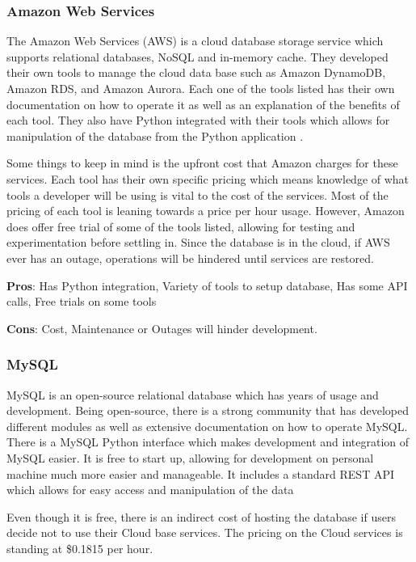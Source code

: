 \documentclass[10pt, onecolumn, draftclsnofoot, letterpaper, compsoc]{IEEEtran}
\begin{document}
    \subsubsection{Amazon Web Services}
    The Amazon Web Services (AWS) is a cloud database storage service which supports relational databases, NoSQL and in-memory cache.
    They developed their own tools to manage the cloud data base such as Amazon DynamoDB, Amazon RDS, and Amazon Aurora.
    Each one of the tools listed has their own documentation on how to operate it as well as an explanation of the benefits of each tool.
    They also have Python integrated with their tools which allows for manipulation of the database from the Python application \cite{awsdatabase}.\par
    Some things to keep in mind is the upfront cost that Amazon charges for these services.
    Each tool has their own specific pricing which means knowledge of what tools a developer will be using is vital to the cost of the services.
    Most of the pricing of each tool is leaning towards a price per hour usage.
    However, Amazon does offer free trial of some of the tools listed, allowing for testing and experimentation before settling in.
    Since the database is in the cloud, if AWS ever has an outage, operations will be hindered until services are restored.
    
    \textbf{Pros}: Has Python integration, Variety of tools to setup database, Has some API calls, Free trials on some tools
    
    \textbf{Cons}: Cost, Maintenance or Outages will hinder development.
    
    \subsubsection{MySQL}
    MySQL is an open-source relational database which has years of usage and development.
    Being open-source, there is a strong community that has developed different modules as well as extensive documentation on how to operate MySQL.
    There is a MySQL Python interface which makes development and integration of MySQL easier.
    It is free to start up, allowing for development on personal machine much more easier and manageable.
    It includes a standard REST API which allows for easy access and manipulation of the data \cite{mysql}\par
    Even though it is free, there is an indirect cost of hosting the database if users decide not to use their Cloud base services.
    The pricing on the Cloud services is standing at \$0.1815 per hour.
    
\end{document}
